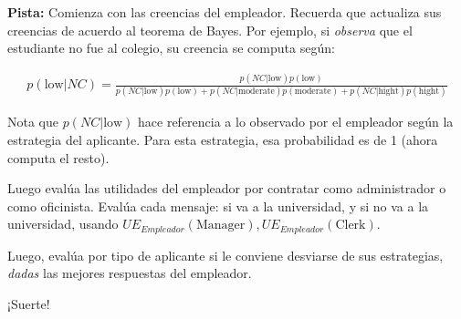 \documentclass[12pt]{scrartcl} %
\begin{document}
\begin{Exercise}[title={Subasta de sobre cerrado con $n$ jugadores},name={Pregunta}]
\textbf{Pista:} Comienza con las creencias del empleador. Recuerda que actualiza sus creencias de acuerdo al teorema de Bayes. Por ejemplo, si \textit{observa} que el estudiante no fue al colegio, su creencia se computa según:

\begin{align*}
  p(\text{low}|NC) = \frac{p(NC | \text{low})p(\text{low})}{p(NC | \text{low})p(\text{low}) + p(NC | \text{moderate})p(\text{moderate})+p(NC | \text{hight})p(\text{hight})}
\end{align*}

Nota que $ p(NC | \text{low}) $ hace referencia a lo observado por el empleador según la estrategia del aplicante. Para esta estrategia, esa probabilidad es de 1 (ahora computa el resto). 

Luego evalúa las utilidades del empleador por contratar como administrador o como oficinista. Evalúa cada mensaje: si va a la universidad, y si no va a la universidad, usando $ UE_{Empleador}(\text{Manager}), UE_{Empleador}(\text{Clerk}) $.

Luego, evalúa por tipo de aplicante si le conviene desviarse de sus estrategias, \textit{dadas} las mejores respuestas del empleador.

\end{Exercise}

\begin{center}
  ¡Suerte!

  \LARGE\Cat[1.2]
\end{center}
\end{document}
